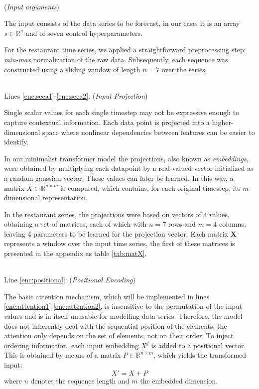 \documentclass[algorithms,article,submit,pdftex,moreauthors]{Definitions/mdpi}
\begin{document}
~\\(\textit{Input arguments})

The input consists of the data series to be forecast, in our case, it is an array $s \in \mathbb{R}^n$ and of seven control hyperparameters.

For the restaurant time series, we applied a straightforward preprocessing step: \textit{min-max} normalization of the raw data. Subsequently, each sequence was constructed using a sliding window of length $n = 7$ over the series.

~\\Lines \ref{enc:seca1}-\ref{enc:seca2}: (\textit{Input Projection})

Single scalar values for each single timestep may not be expressive enough to capture contextual information. Each data point is projected into a higher-dimensional space where nonlinear dependencies between features can be easier to identify. 

In our minimalist transformer model the projections, also known as {\em embeddings}, were obtained by multiplying each datapoint by a real-valued vector initialized as a random gaussian vector. These values can later be learned. In this way, a matrix $X \in \mathbb{R}^{n\times m}$ is computed, which contains, for each original timestep, its $m$-dimensional representation.

In the restaurant series, the projections were based on vectors of 4 values, obtaining a set of matrices, each of which with $n=7$ rows and $m=4$ columns, leaving $4$ parameters to be learned for the projection vector. Each matrix {\bf X} represents a window over the input time series, the first of these matrices is presented in the appendix as table \ref{tab:matX}.

~\\Line \ref{enc:positional}: (\textit{Positional Encoding})

The basic attention mechanism, which will be implemented in lines \ref{enc:attention1}-\ref{enc:attention2}, is insensitive to the permutation of the input values \cite{VSPU17} and is in itself unusable for modelling data series. Therefore, the model does not inherently deal with the sequential position of the elements: the attention only depends on the set of elements, not on their order. To inject ordering information, each input embedding $X^j$ is added to a positional vector. 
This is obtained by means of a matrix $P \in \mathbb{R}^{n \times m}$, which yields the transformed input: 
\begin{equation}
    X' = X + P
\end{equation}
where $n$ denotes the sequence length and $m$ the embedded dimension.
\end{document}
